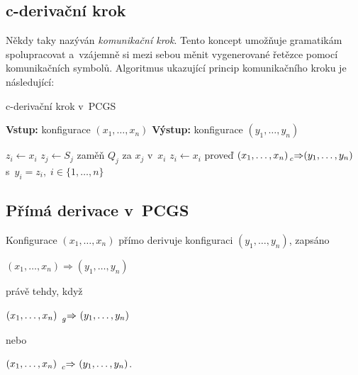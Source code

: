 \subsection*{c-derivační krok}\label{kap_c_der_krok}
Někdy taky nazýván \emph{komunikační krok}. Tento koncept umožňuje gramatikám spolupracovat a~vzájemně si mezi sebou měnit vygenerované řetězce pomocí komunikačních symbolů.
Algoritmus ukazující princip komunikačního kroku je následující:
\begin{algorithm}[h]
    \caption{c-derivační krok v~PCGS}
    \label{alg_c_der_krok}
    \begin{algorithmic}[1]
        \State \textbf{Vstup:} konfigurace $(x_1, \ldots, x_n)$
        \State \textbf{Výstup:} konfigurace $(y_1, \ldots, y_n)$
        \State 

            \State $z_i \gets x_i$
        \EndFor 
                    \State $z_j \gets S_j$
                    \State zaměň $Q_j$ za $x_j$ v~$x_i$
                    \State $z_i \gets x_i$ 
                \EndFor
            \EndIf
        \EndFor
        \State proveď $(x_1, \ldots, x_n) \prescript{}{c}{\Rightarrow} (y_1, \ldots, y_n)$ s~$y_i = z_i,\;i \in \{1, \ldots, n\}$ 
    \end{algorithmic}
\end{algorithm}

\subsection*{Přímá derivace v~PCGS}
\begin{definition}
    Konfigurace $(x_1, \ldots, x_n)$ přímo derivuje konfiguraci $(y_1, \ldots, y_n)$, zapsáno
    \begin{center}
        $(x_1, \ldots, x_n) \Rightarrow (y_1, \ldots, y_n)$
    \end{center} 
    právě tehdy, když
    \begin{center}
        $(x_1, \ldots, x_n)\ \prescript{}{g}{\Rightarrow}\ (y_1, \ldots, y_n)$
    \end{center}
    nebo
    \begin{center}
        $(x_1, \ldots, x_n)\ \prescript{}{c}{\Rightarrow}\ (y_1, \ldots, y_n)$.
    \end{center}
\end{definition}

